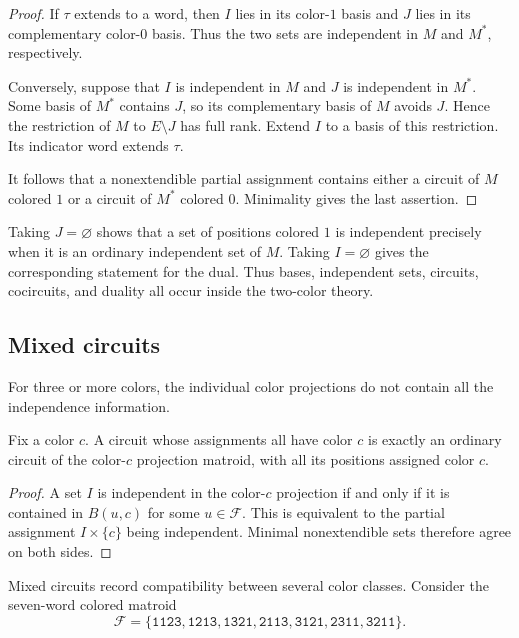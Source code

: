 \begin{proof}
If $\tau$ extends to a word, then $I$ lies in its color-$1$ basis and $J$
lies in its complementary color-$0$ basis. Thus the two sets are independent
in $M$ and $M^*$, respectively.

Conversely, suppose that $I$ is independent in $M$ and $J$ is independent
in $M^*$. Some basis of $M^*$ contains $J$, so its complementary basis of
$M$ avoids $J$. Hence the restriction of $M$ to $E\setminus J$ has full
rank. Extend $I$ to a basis of this restriction. Its indicator word extends
$\tau$.

It follows that a nonextendible partial assignment contains either a circuit
of $M$ colored $1$ or a circuit of $M^*$ colored $0$. Minimality gives the
last assertion.
\end{proof}

Taking $J=\varnothing$ shows that a set of positions colored $1$ is
independent precisely when it is an ordinary independent set of $M$. Taking
$I=\varnothing$ gives the corresponding statement for the dual. Thus bases,
independent sets, circuits, cocircuits, and duality all occur inside the
two-color theory.

\subsection[mixedCircuits]{Mixed circuits}

For three or more colors, the individual color projections do not contain
all the independence information.

\begin{proposition}
Fix a color $c$. A circuit whose assignments all have color $c$ is exactly
an ordinary circuit of the color-$c$ projection matroid, with all its
positions assigned color $c$.
\end{proposition}

\begin{proof}
A set $I$ is independent in the color-$c$ projection if and only if it is
contained in $B(u,c)$ for some $u\in\mathcal F$. This is equivalent to the
partial assignment $I\times\{c\}$ being independent. Minimal nonextendible
sets therefore agree on both sides.
\end{proof}

Mixed circuits record compatibility between several color classes. Consider
the seven-word colored matroid
\[
 \mathcal F=\{\mathtt{1123},\mathtt{1213},\mathtt{1321},
 \mathtt{2113},\mathtt{3121},\mathtt{2311},\mathtt{3211}\}.
\]

